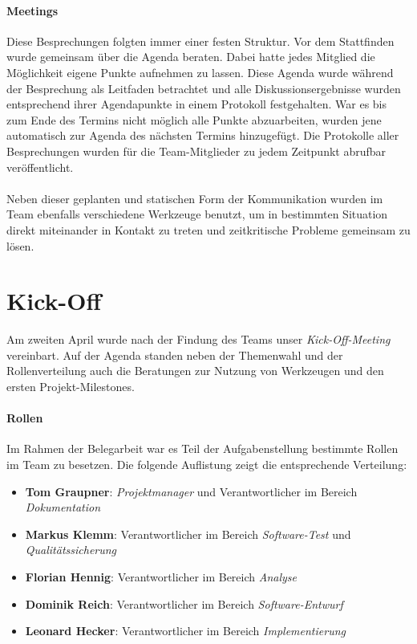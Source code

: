 \paragraph{Meetings}Diese Besprechungen folgten immer einer festen Struktur. Vor dem Statt\-finden wurde gemeinsam über die Agenda beraten. Dabei hatte jedes Mitglied die Möglichkeit eigene Punkte aufnehmen zu lassen. Diese Agenda wurde während der Besprechung als Leitfaden betrachtet und alle Diskussionsergebnisse wurden entsprechend ihrer Agendapunkte in einem Protokoll festgehalten. War es bis zum Ende des Termins nicht möglich alle Punkte abzuarbeiten, wurden jene automatisch zur Agenda des nächsten Termins hinzugefügt. Die Protokolle aller Besprechungen wurden für die Team-Mitglieder zu jedem Zeitpunkt abrufbar veröffentlicht.

\paragraph{}Neben dieser geplanten und statischen Form der Kommunikation wurden im Team ebenfalls verschiedene Werkzeuge benutzt, um in bestimmten Situation direkt miteinander in Kontakt zu treten und zeitkritische Probleme gemeinsam zu lösen.

\section{Kick-Off}
Am zweiten April wurde nach der Findung des Teams unser \textit{Kick-Off-Meeting} vereinbart. Auf der Agenda standen neben der Themenwahl und der Rollenverteilung auch die Beratungen zur Nutzung von Werkzeugen und den ersten Projekt-Milestones.

\paragraph{Rollen}Im Rahmen der Belegarbeit war es Teil der Aufgabenstellung bestimmte Rollen im Team zu besetzen. Die folgende Auflistung zeigt die entsprechende Verteilung:

\begin{itemize}
	\item \textbf{Tom Graupner}: \textit{Projektmanager} und Verantwortlicher im Bereich \textit{Dokumentation}
	\item \textbf{Markus Klemm}: Verantwortlicher im Bereich \textit{Software-Test }und \textit{Qualitäts\-sicherung}
	\item \textbf{Florian Hennig}: Verantwortlicher im Bereich \textit{Analyse}
	\item \textbf{Dominik Reich}: Verantwortlicher im Bereich \textit{Software-Entwurf}
	\item \textbf{Leonard Hecker}: Verantwortlicher im Bereich \textit{Implementierung}
\end{itemize}


